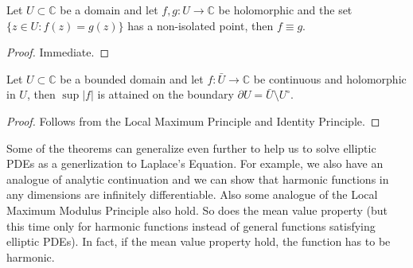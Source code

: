 \begin{corollary}
    Let $U\subset \mathbb C$ be a domain and let $f,g:U\to\mathbb C$ be holomorphic and the set $\{z\in U:f(z)=g(z)\}$ has a non-isolated point, then $f\equiv g$.
\end{corollary}
\begin{proof}
    Immediate.
\end{proof}
\begin{corollary}
    Let $U\subset\mathbb C$ be a bounded domain and let $f:\bar{U}\to\mathbb C$ be continuous and holomorphic in $U$, then $\sup|f|$ is attained on the boundary $\partial U=\bar U\setminus U^\circ$.
\end{corollary}
\begin{proof}
    Follows from the Local Maximum Principle and Identity Principle.
\end{proof}
\begin{remark}
    Some of the theorems can generalize even further to help us to solve elliptic PDEs as a generlization to Laplace's Equation.
    For example, we also have an analogue of analytic continuation and we can show that harmonic functions in any dimensions are infinitely differentiable.
    Also some analogue of the Local Maximum Modulus Principle also hold.
    So does the mean value property (but this time only for harmonic functions instead of general functions satisfying elliptic PDEs).
    In fact, if the mean value property hold, the function has to be harmonic.
\end{remark}